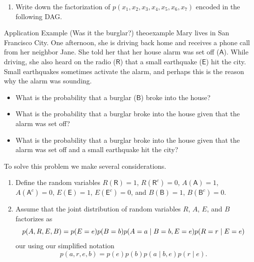 \documentclass{tufte-handout}
\begin{document}
\begin{itemize}
\begin{enumerate}
\item Write down the factorization of $p(x_1,x_2,x_3,x_4,x_5,x_6,x_7) $ encoded in the following DAG.
\begin{center}
\end{center}

	\end{enumerate}

\end{itemize}




\begin{mybox}{Application Example (Was it the burglar?) }{theoexample}
 Mary lives in San Francisco City. One afternoon, she is driving back home and receives a phone call from 
 her neighbor Jane. She told her that her house alarm was set off ($\mathsf  A$). While driving, she also heard on the radio
 ($\mathsf  R$) that a small earthquake ($\mathsf  E$) hit the city.  Small earthquakes sometimes activate the alarm, and perhaps
 this is the reason why the alarm was sounding.
 \begin{itemize}
 \item What is the probability that a burglar ($\mathsf B$) broke into the house?
 \item What is the probability that a burglar broke into the house
 given that the alarm was set off?
 \item What is the probability that a burglar broke into the house
 given that the alarm was set off and a small earthquake hit the city?
 \end{itemize} 
\end{mybox}

To solve this problem we make several considerations.
\begin{enumerate}
\item Define the random variables $R(\mathsf R )=1$, $R(\mathsf R^c )=0$, $A(\mathsf A )=1$, $A(\mathsf A^c )=0$,
$E(\mathsf E )=1$, $E(\mathsf E^c )=0$, and $B(\mathsf B )=1$, $B(\mathsf B^c )=0$.
\item Assume that the joint distribution of random variables $R$, $A$, $E$, and $B$ factorizes as 
 $$\small p(A,R,E,B)=p(E=e)p(B=b)p(A=a\mid B=b,E=e)p(R=r\mid E=e)$$ our using our simplified 
notation
 $$p(a,r,e,b)=p(e)p(b)p(a\mid b,e)p(r\mid e).$$
\end{enumerate}
\end{document}
